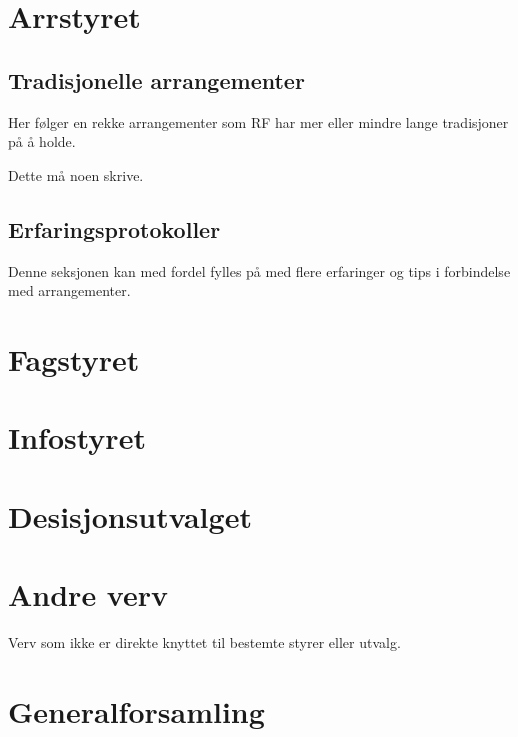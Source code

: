 \documentclass[11pt,norsk,a4paper,pointlessnumbers]{scrbook}
\begin{document}
\chapter{Arrstyret}

\section{Tradisjonelle arrangementer}
Her følger en rekke arrangementer som RF har mer eller mindre lange
tradisjoner på å holde.

Dette må noen skrive.
%
%
%
%
%
%

\section{Erfaringsprotokoller}
Denne seksjonen kan med fordel fylles på med flere erfaringer og tips
i forbindelse med arrangementer.



\chapter{Fagstyret}


\chapter{Infostyret}



\chapter{Desisjonsutvalget}


\chapter{Andre verv}
Verv som ikke er direkte knyttet til bestemte styrer eller utvalg.



\chapter{Generalforsamling}

\end{document}
